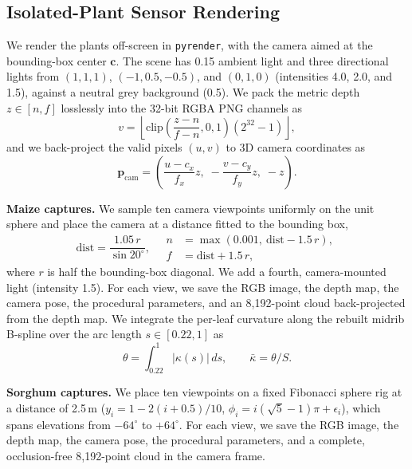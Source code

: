 \documentclass[10pt,twocolumn,letterpaper]{article}
\begin{document}
\subsection{Isolated-Plant Sensor Rendering}
We render the plants off-screen in \texttt{pyrender}, with the camera aimed at the bounding-box center $\mathbf{c}$. The scene has 0.15 ambient light and three directional lights from $(1,1,1)$, $(-1,0.5,-0.5)$, and $(0,1,0)$ (intensities 4.0, 2.0, and 1.5), against a neutral grey background (0.5). We pack the metric depth $z \in [n, f]$ losslessly into the 32-bit RGBA PNG channels as
\begin{equation}
  v = \left\lfloor \mathrm{clip}\left(\frac{z-n}{f-n}, 0, 1\right) (2^{32}-1) \right\rfloor,
\end{equation}
and we back-project the valid pixels $(u,v)$ to 3D camera coordinates as
\begin{equation}
  \mathbf{p}_{\mathrm{cam}} = \left( \frac{u - c_x}{f_x} z,\; -\frac{v - c_y}{f_y} z,\; -z \right).
  \label{eq:supp-backproject}
\end{equation}

\noindent\textbf{Maize captures.} We sample ten camera viewpoints uniformly on the unit sphere and place the camera at a distance fitted to the bounding box,
\begin{equation}
  \mathrm{dist} = \frac{1.05\,r}{\sin 20^\circ},\quad
  \begin{aligned}
    n &= \max(0.001,\ \mathrm{dist} - 1.5\,r),\\
    f &= \mathrm{dist} + 1.5\,r,
  \end{aligned}
  \label{eq:supp-maizecam}
\end{equation}
where $r$ is half the bounding-box diagonal. We add a fourth, camera-mounted light (intensity 1.5). For each view, we save the RGB image, the depth map, the camera pose, the procedural parameters, and an 8{,}192-point cloud back-projected from the depth map. We integrate the per-leaf curvature along the rebuilt midrib B-spline over the arc length $s \in [0.22, 1]$ as
\begin{equation}
  \theta = \int_{0.22}^{1} \lvert \kappa(s) \rvert \, ds,
  \qquad \bar\kappa = \theta / S.
  \label{eq:supp-curvature}
\end{equation}

\noindent\textbf{Sorghum captures.} We place ten viewpoints on a fixed Fibonacci sphere rig at a distance of 2.5\,m ($y_i = 1 - 2(i+0.5)/10$, $\phi_i = i(\sqrt{5}-1)\pi + \epsilon_i$), which spans elevations from $-64^\circ$ to $+64^\circ$. For each view, we save the RGB image, the depth map, the camera pose, the procedural parameters, and a complete, occlusion-free 8{,}192-point cloud in the camera frame.
\end{document}
